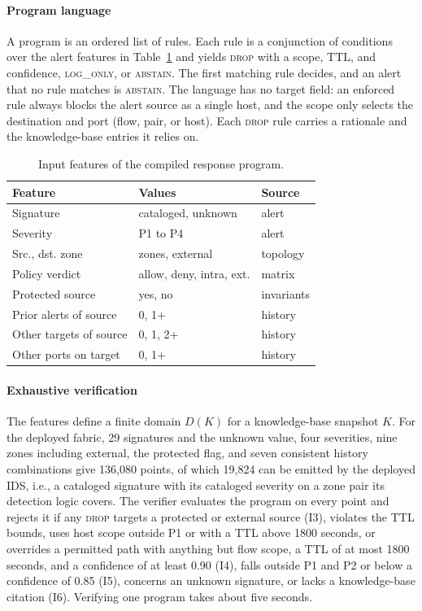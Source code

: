 \documentclass[final,5p]{elsarticle}
\begin{document}
\paragraph{Program language}
A program is an ordered list of rules. Each rule is a conjunction of conditions over the alert features in Table~\ref{tab:program_inputs} and yields \textsc{drop} with a scope, TTL, and confidence, \textsc{log\_only}, or \textsc{abstain}. The first matching rule decides, and an alert that no rule matches is \textsc{abstain}. The language has no target field: an enforced rule always blocks the alert source as a single host, and the scope only selects the destination and port (flow, pair, or host). Each \textsc{drop} rule carries a rationale and the knowledge-base entries it relies on.

\begin{table}[tbp]
    \centering
    \caption{Input features of the compiled response program.}
    \label{tab:program_inputs}
    \small
    \setlength{\tabcolsep}{4pt}
    \begin{tabular}{@{}lll@{}}
        \toprule
        \textbf{Feature} & \textbf{Values} & \textbf{Source} \\
        \midrule
        Signature & cataloged, unknown & alert \\
        Severity & P1 to P4 & alert \\
        Src., dst. zone & zones, external & topology \\
        Policy verdict & allow, deny, intra, ext. & matrix \\
        Protected source & yes, no & invariants \\
        Prior alerts of source & 0, 1+ & history \\
        Other targets of source & 0, 1, 2+ & history \\
        Other ports on target & 0, 1+ & history \\
        \bottomrule
    \end{tabular}
\end{table}

\paragraph{Exhaustive verification}
The features define a finite domain $D(K)$ for a knowledge-base snapshot $K$. For the deployed fabric, 29 signatures and the unknown value, four severities, nine zones including external, the protected flag, and seven consistent history combinations give 136,080 points, of which 19,824 can be emitted by the deployed IDS, i.e., a cataloged signature with its cataloged severity on a zone pair its detection logic covers. The verifier evaluates the program on every point and rejects it if any \textsc{drop} targets a protected or external source (I3), violates the TTL bounds, uses host scope outside P1 or with a TTL above 1800 seconds, or overrides a permitted path with anything but flow scope, a TTL of at most 1800 seconds, and a confidence of at least 0.90 (I4), falls outside P1 and P2 or below a confidence of 0.85 (I5), concerns an unknown signature, or lacks a knowledge-base citation (I6). Verifying one program takes about five seconds.
\end{document}
